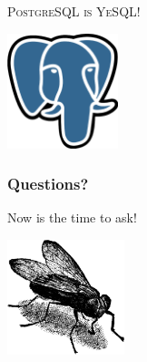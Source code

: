 \documentclass{beamer}
\begin{document}
\begin{frame}
  \begin{center}
    \textsc{\Huge PostgreSQL is YeSQL!}
    \vfill

    \includegraphics[height=9em]{postgres-logo.eps}
  \end{center}
\end{frame}

\begin{frame}
  \frametitle{Questions?}

  \begin{center}
    Now is the time to ask!
    \vfill

    \includegraphics[height=9em]{fly.png}
  \end{center}
\end{frame}
\end{document}

